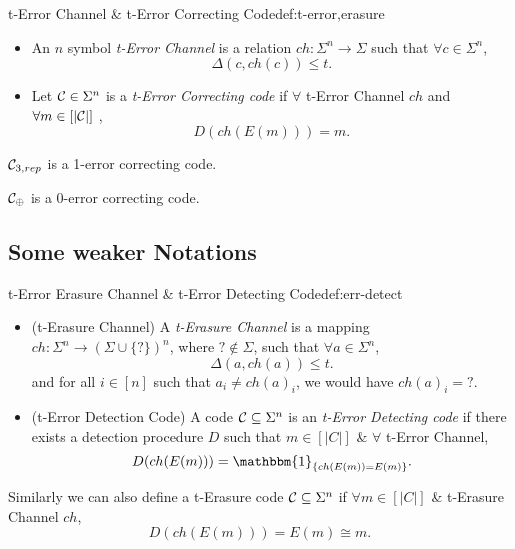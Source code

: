 \begin{definition}{t-Error Channel \& t-Error Correcting Code}{def:t-error,erasure}
	\begin{itemize}
\item {} An $n$ symbol \textit{t-Error Channel} is a relation $ch : \Sigma^n\to \Sigma$ such that $\forall c\in\Sigma^n$, 
\[
\Delta(c, ch(c))\leq t.
\]
\item {} Let $\mathcal{C}\in\Sigma^n$ is a \textit{t-Error Correcting code} if $\forall$ t-Error Channel $ch$ and $\forall m\in[|\mathcal{C}|]$ ,
\[
D(ch(E(m))) = m.
\]
\end{itemize}

\end{definition}
\begin{example}
$\mathcal{C}_{3,rep}$ is a 1-error correcting code.
\end{example}
\begin{example}
$\mathcal{C}_\oplus$ is a 0-error correcting code.
\end{example}

\subsection{Some weaker Notations}
\begin{definition}{t-Error Erasure Channel \& t-Error Detecting Code}{def:err-detect}
       \begin{itemize}
       	\item (t-Erasure Channel) A \textit{t-Erasure Channel} is a mapping $ch : \Sigma^n\to (\Sigma\cup\{?\})^n$, where $?\notin\Sigma$, such that $\forall a\in\Sigma^n$, 
       	\[
       	\Delta(a, ch(a))\leq t.
       	\]
       	and for all $i\in[n]$ such that $a_i\neq ch(a)_i$, we would have $ch(a)_i = ?$.
       	\item (t-Error Detection Code) A code $\mathcal{C}\subseteq\Sigma^n$ is an \textit{t-Error Detecting code} if there exists a detection procedure $D$ such that $m\in[|C|]$ \& $\forall$ t-Error Channel,
       	\[
       	     D(ch(E(m))) = \mathbbm{1}_{\{ch(E(m)) = E(m)\}}.
       	\]
       	       	       \end{itemize}
\end{definition}

\begin{remark}
      Similarly we can also define a t-Erasure code $\mathcal{C}\subseteq\Sigma^n$ if $\forall m \in [|C|]$ \& t-Erasure Channel $ch$, 
      \[
      D(ch(E(m))) = E(m) \cong m.
      \]
\end{remark}
\begin{example}

\end{example}

